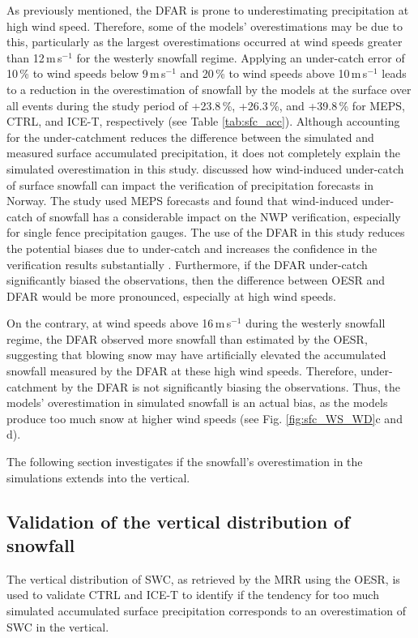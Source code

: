 \documentclass{ametsocV5}
\begin{document}
		As previously mentioned, the DFAR is prone to underestimating precipitation at high wind speed. Therefore, some of the models' overestimations may be due to this, particularly as the largest overestimations occurred at wind speeds greater than 12\,m\,s$^{-1}$ for the westerly snowfall regime. Applying an under-catch error of 10\,\% to wind speeds below 9\,m\,s$^{-1}$ and 20\,\% to wind speeds above 10\,m\,s$^{-1}$ leads to a reduction in the overestimation of snowfall by the models at the surface over all events during the study period of +23.8\,\%, +26.3\,\%, and +39.8\,\% for MEPS, CTRL, and ICE-T, respectively (see Table \ref{tab:sfc_acc}). Although accounting for the under-catchment reduces the difference between the simulated and measured surface accumulated precipitation, it does not completely explain the simulated overestimation in this study. \citet{koltzow_verification_2020} discussed how wind-induced under-catch of surface snowfall can impact the verification of precipitation forecasts in Norway. The study used MEPS forecasts and found that wind-induced under-catch of snowfall has a considerable impact on the NWP verification, especially for single fence precipitation gauges. The use of the DFAR in this study reduces the potential biases due to under-catch and increases the confidence in the verification results substantially \citep{koltzow_verification_2020}. Furthermore, if the DFAR under-catch significantly biased the observations, then the difference between OESR and DFAR would be more pronounced, especially at high wind speeds. 

		On the contrary, at wind speeds above 16\,m\,s$^{-1}$ during the westerly snowfall regime, the DFAR observed more snowfall than estimated by the OESR, suggesting that blowing snow may have artificially elevated the accumulated snowfall measured by the DFAR at these high wind speeds. Therefore, under-catchment by the DFAR is not significantly biasing the observations. Thus, the models' overestimation in simulated snowfall is an actual bias, as the models produce too much snow at higher wind speeds (see Fig. \ref{fig:sfc_WS_WD}c and d).

		The following section investigates if the snowfall's overestimation in the simulations extends into the vertical.


	\subsection{Validation of the vertical distribution of snowfall}\label{sec:res:swc}
		The vertical distribution of SWC, as retrieved by the MRR using the OESR, is used to validate CTRL and ICE-T to identify if the tendency for too much simulated accumulated surface precipitation corresponds to an overestimation of SWC in the vertical.
\end{document}
